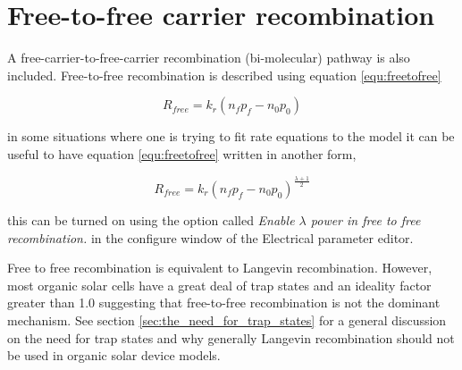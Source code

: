 
\section{Free-to-free carrier recombination}
A free-carrier-to-free-carrier recombination (bi-molecular) pathway is also included.  Free-to-free recombination is described using equation \ref{equ:freetofree}

\begin{equation}
R_{free}=k_{r}(n_{f}p_{f}-n_{0}p_{0})
\label{equ:freetofree}
\end{equation}

in some situations where one is trying to fit rate equations to the model it can be useful to have equation \ref{equ:freetofree} written in another form,

\begin{equation}
R_{free}=k_{r}(n_{f}p_{f}-n_{0}p_{0})^{\frac{\lambda+1}{2}}
\label{equ:freetofree_lambda}
\end{equation}

this can be turned on using the option called  \emph{Enable $\lambda$ power in free to free recombination.} in the configure window of the Electrical parameter editor.

Free to free recombination is equivalent to Langevin recombination. However, most organic solar cells have a great deal of trap states and an ideality factor greater than 1.0 suggesting that free-to-free recombination is not the dominant mechanism. See section \ref{sec:the_need_for_trap_states} for a general discussion on the need for trap states and why generally Langevin recombination should not be used in organic solar device models. 
